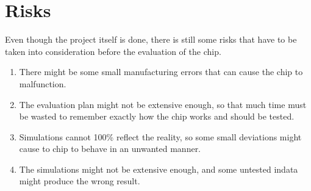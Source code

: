 \section{Risks} \label{sec:risks}
Even though the project itself is done, there is still some risks that have to be taken into consideration before the evaluation of the chip.

\begin{enumerate}
	\item There might be some small manufacturing errors that can cause the chip to malfunction.
	\item The evaluation plan might not be extensive enough, so that much time must be wasted to remember exactly how the chip works and should be tested.
	\item Simulations cannot 100\% reflect the reality, so some small deviations might cause to chip to behave in an unwanted manner.
	\item The simulations might not be extensive enough, and some untested indata might produce the wrong result.
\end{enumerate}